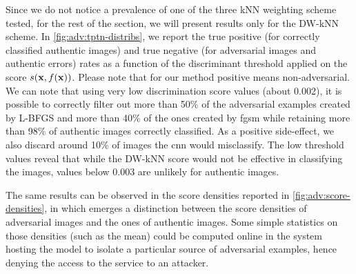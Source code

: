 Since we do not notice a prevalence of one of the three kNN weighting scheme tested, for the rest of the section, we will present results only for the DW-kNN scheme.
In \ref{fig:adv:tptn-distribs}, we report the true positive (for correctly classified authentic images) and true negative (for adversarial images and authentic errors) rates as a function of the discriminant threshold applied on the score $s(\mathbf{x}, f(\mathbf{x}))$.
Please note that for our method positive means non-adversarial.
We can note that using very low discrimination score values (about 0.002), it is possible to correctly filter out more than 50\% of the adversarial examples created by L-BFGS and more than 40\% of the ones created by \gls{fgsm} while retaining more than 98\% of authentic images correctly classified.
As a positive side-effect, we also discard around 10\% of images the \gls{cnn} would misclassify.
The low threshold values reveal that while the DW-kNN score would not be effective in classifying the images, values below 0.003 are unlikely for authentic images.

The same results can be observed in the score densities reported in \ref{fig:adv:score-densities}, in which emerges a distinction between the score densities of adversarial images and the ones of authentic images.
Some simple statistics on those densities (such as the mean) could be computed online in the system hosting the model to isolate a particular source of adversarial examples, hence denying the access to the service to an attacker.

% 

